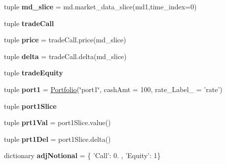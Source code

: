\begin{DoxyCompactItemize}
\item 
\hypertarget{namespacestrategy__tester_1_1Portfolio_a8827b8e775691d80d144f9ecc32513bf}{tuple {\bfseries md\-\_\-slice} = md.\-market\-\_\-data\-\_\-slice(md1,time\-\_\-index=0)}\label{namespacestrategy__tester_1_1Portfolio_a8827b8e775691d80d144f9ecc32513bf}

\item 
tuple {\bfseries trade\-Call}
\item 
\hypertarget{namespacestrategy__tester_1_1Portfolio_a4d6fed98e8e0cfa9848a137414d30f6a}{tuple {\bfseries price} = trade\-Call.\-price(md\-\_\-slice)}\label{namespacestrategy__tester_1_1Portfolio_a4d6fed98e8e0cfa9848a137414d30f6a}

\item 
\hypertarget{namespacestrategy__tester_1_1Portfolio_a68f9d81793e1cf34f97c0382945d5491}{tuple {\bfseries delta} = trade\-Call.\-delta(md\-\_\-slice)}\label{namespacestrategy__tester_1_1Portfolio_a68f9d81793e1cf34f97c0382945d5491}

\item 
tuple {\bfseries trade\-Equity}
\item 
\hypertarget{namespacestrategy__tester_1_1Portfolio_a93a5782bed3b657dcd4d083ce8f36281}{tuple {\bfseries port1} = \hyperlink{classstrategy__tester_1_1Portfolio_1_1Portfolio}{\-Portfolio}(\char`\"{}port1\char`\"{}, cash\-Amt = 100, rate\-\_\-\-Label\-\_\- = 'rate')}\label{namespacestrategy__tester_1_1Portfolio_a93a5782bed3b657dcd4d083ce8f36281}

\item 
tuple {\bfseries port1\-Slice}
\item 
\hypertarget{namespacestrategy__tester_1_1Portfolio_aa366191466e4b0e97662378ea52b31d0}{tuple {\bfseries prt1\-Val} = port1\-Slice.\-value()}\label{namespacestrategy__tester_1_1Portfolio_aa366191466e4b0e97662378ea52b31d0}

\item 
\hypertarget{namespacestrategy__tester_1_1Portfolio_a7064c5a0b2943f8f5df9060422cf2766}{tuple {\bfseries prt1\-Del} = port1\-Slice.\-delta()}\label{namespacestrategy__tester_1_1Portfolio_a7064c5a0b2943f8f5df9060422cf2766}

\item 
\hypertarget{namespacestrategy__tester_1_1Portfolio_ab5eaa0afdb6b416591e79450a5503caa}{dictionary {\bfseries adj\-Notional} = \{ '\-Call'\-: 0. , '\-Equity'\-: 1\}}\label{namespacestrategy__tester_1_1Portfolio_ab5eaa0afdb6b416591e79450a5503caa}

\end{DoxyCompactItemize}


